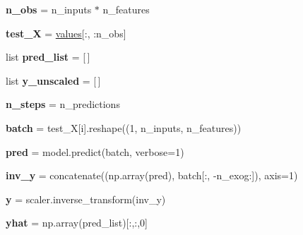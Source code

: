 \begin{DoxyCompactItemize}
{\bfseries n\+\_\+obs} = n\+\_\+inputs $\ast$ n\+\_\+features
\item 
\mbox{\label{classsimulator_1_1Simulator_a68cde3ef37bed9121e42094abc8f2593}} 
{\bfseries test\+\_\+X} = \hyperlink{classsimulator_1_1Simulator_afd708a73cba150a90c4120bb9b10323d}{values}\mbox{[}\+:, \+:n\+\_\+obs\mbox{]}
\item 
\mbox{\label{classsimulator_1_1Simulator_a11b5f4ef81017b79d0990f12bdc1d9b3}} 
list {\bfseries pred\+\_\+list} = \mbox{[}$\,$\mbox{]}
\item 
\mbox{\label{classsimulator_1_1Simulator_aadf6294f0aa62c00c48a5d9ddd014c5c}} 
list {\bfseries y\+\_\+unscaled} = \mbox{[}$\,$\mbox{]}
\item 
\mbox{\label{classsimulator_1_1Simulator_a97303f3e8a68d3ad426955454488c2a9}} 
{\bfseries n\+\_\+steps} = n\+\_\+predictions
\item 
\mbox{\label{classsimulator_1_1Simulator_aea5dfb20d69fc6faae0bd3f81e8de504}} 
{\bfseries batch} = test\+\_\+X\mbox{[}i\mbox{]}.reshape((1, n\+\_\+inputs, n\+\_\+features))
\item 
\mbox{\label{classsimulator_1_1Simulator_a95293ea1e7c02250681cde22c77bf64f}} 
{\bfseries pred} = model.\+predict(batch, verbose=1)
\item 
\mbox{\label{classsimulator_1_1Simulator_a3d79d7cead00a87aed2f1c1b1074fb43}} 
{\bfseries inv\+\_\+y} = concatenate((np.\+array(pred), batch\mbox{[}\+:, -\/n\+\_\+exog\+:\mbox{]}), axis=1)
\item 
\mbox{\label{classsimulator_1_1Simulator_a0f3e47b2f72fc99c91ca213a82a8e149}} 
{\bfseries y} = scaler.\+inverse\+\_\+transform(inv\+\_\+y)
\item 
\mbox{\label{classsimulator_1_1Simulator_aa2c935eacc99013c829732c4f0fa3fc8}} 
{\bfseries yhat} = np.\+array(pred\+\_\+list)\mbox{[}\+:,\+:,0\mbox{]}
\item 
\mbox{\label{classsimulator_1_1Simulator_a9e5bf07410f0b18a59e298eb14ca0255}} 

\end{DoxyCompactItemize}
